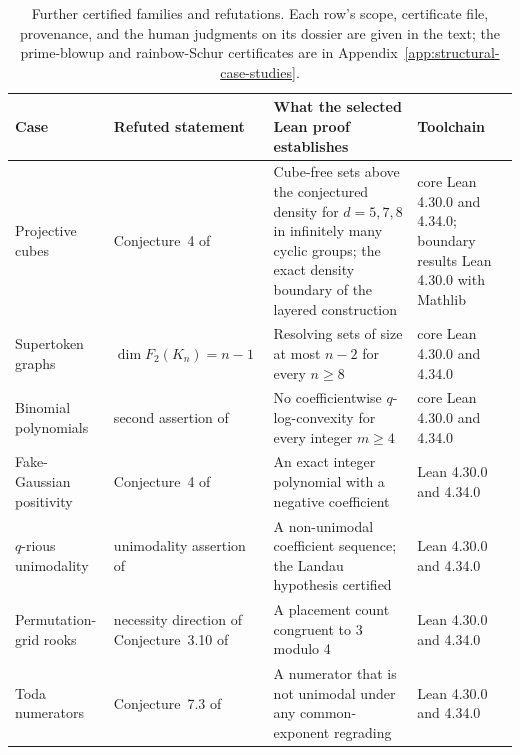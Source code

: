 \begin{table}[ht]
\centering\small
\setlength{\tabcolsep}{4pt}
\begin{tabular}{@{}p{.16\linewidth}p{.28\linewidth}p{.31\linewidth}p{.16\linewidth}@{}}
\toprule
Case & Refuted statement & What the selected Lean proof establishes & Toolchain \\
\midrule
Projective cubes & Conjecture~4 of \citet{meng2026cubefree} & Cube-free sets above the conjectured density for $d=5,7,8$ in infinitely many cyclic groups; the exact density boundary of the layered construction & core Lean 4.30.0 and 4.34.0; boundary results Lean 4.30.0 with Mathlib \\
Supertoken graphs & $\dim F_2(K_n)=n-1$ \citep{baskoro2025supertoken} & Resolving sets of size at most $n-2$ for every $n\ge8$ & core Lean 4.30.0 and 4.34.0 \\
Binomial polynomials & second assertion of \citet{sun2025polynomials} & No coefficientwise $q$-log-convexity for every integer $m\ge4$ & core Lean 4.30.0 and 4.34.0 \\
Fake-Gaussian positivity & Conjecture~4 of \citet{gatzweilerkrattenthaler2025positivity} & An exact integer polynomial with a negative coefficient & Lean 4.30.0 and 4.34.0 \\
$q$-rious unimodality & unimodality assertion of \citet{warnaarzudilin2025qrious} & A non-unimodal coefficient sequence; the Landau hypothesis certified & Lean 4.30.0 and 4.34.0 \\
Permutation-grid rooks & necessity direction of Conjecture~3.10 of \citet{lewiswon2026permutationgrids} & A placement count congruent to 3 modulo 4 & Lean 4.30.0 and 4.34.0 \\
Toda numerators & Conjecture~7.3 of \citet{labelle2026toda} & A numerator that is not unimodal under any common-exponent regrading & Lean 4.30.0 and 4.34.0 \\
\bottomrule
\end{tabular}
\caption{Further certified families and refutations. Each row's scope, certificate file, provenance, and the human judgments on its dossier are given in the text; the prime-blowup and rainbow-Schur certificates are in Appendix~\ref{app:structural-case-studies}.}
\label{tab:certified-research-extensions}
\end{table}

